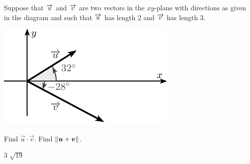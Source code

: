 
\begin{Exercise}[
name={},
title={}, 
difficulty=0,
origin={\cite{MH}}]
Suppose that $\overrightarrow{u}$ and $\overrightarrow{v}$ are two vectors in the $xy$-plane with directions as given in the diagram and such that $\overrightarrow{u}$ has length 2 and $\overrightarrow{v}$ has length 3.
\begin{minipage}[m]{\linewidth}
\centering
\includegraphics[width=\linewidth/2]{vector_geometry/dot_product_and_projections/figures/mh2}
\end{minipage}
\Question Find $\vec u\cdot\vec v$.
\Question Find $\lVert\bm{u}+\bm{v}\rVert$.
\end{Exercise}

\begin{Answer}
\begin{multicols}{2}
\Question $3$
\Question $\sqrt{19}$
\EndCurrentQuestion
\end{multicols}
\end{Answer}
